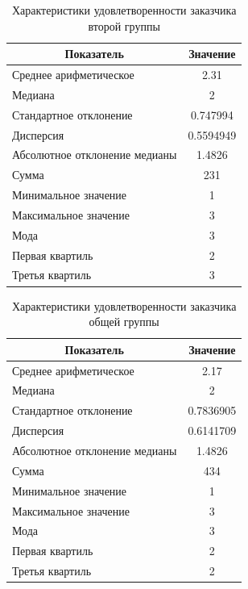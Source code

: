 \begin{table}[H]
	\centering
	\caption{Характеристики удовлетворенности заказчика второй группы}
	\begin{tabular}{|l|c|}
		\hline
		\multicolumn{1}{|c|}{\textbf{Показатель}} & \textbf{Значение}\\ \hline
		Среднее арифметическое        & 2.31      \\ \hline
		Медиана                       & 2         \\ \hline
		Стандартное отклонение        & 0.747994  \\ \hline
		Дисперсия                      & 0.5594949 \\ \hline
		Абсолютное отклонение медианы & 1.4826    \\ \hline
		Сумма                         & 231       \\ \hline
		Минимальное значение          & 1         \\ \hline
		Максимальное значение         & 3         \\ \hline
		Мода & 3 \\ \hline
		Первая квартиль & 2 \\ \hline
		Третья квартиль & 3 \\ \hline
	\end{tabular}
\end{table}

\begin{table}[H]
	\centering
	\caption{Характеристики удовлетворенности заказчика общей группы}
	\begin{tabular}{|l|c|}
		\hline
		\multicolumn{1}{|c|}{\textbf{Показатель}} & \textbf{Значение}\\ \hline
		Среднее арифметическое        & 2.17      \\ \hline
		Медиана                       & 2         \\ \hline
		Стандартное отклонение        & 0.7836905 \\ \hline
		Дисперсия                      & 0.6141709 \\ \hline
		Абсолютное отклонение медианы & 1.4826    \\ \hline
		Сумма                         & 434       \\ \hline
		Минимальное значение          & 1         \\ \hline
		Максимальное значение         & 3         \\ \hline
		Мода & 3 \\ \hline
		Первая квартиль & 2 \\ \hline
		Третья квартиль & 2 \\ \hline
	\end{tabular}
\end{table}





